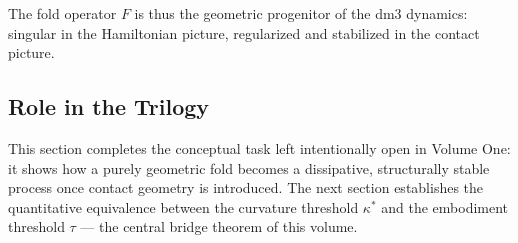 The fold operator $F$ is thus the geometric progenitor of the
dm3 dynamics: singular in the Hamiltonian picture, regularized
and stabilized in the contact picture.

\subsection{Role in the Trilogy}
\label{subsec:trilogy-role}

This section completes the conceptual task left intentionally
open in Volume One: it shows how a purely geometric fold becomes
a dissipative, structurally stable process once contact geometry
is introduced. The next section establishes the quantitative
equivalence between the curvature threshold $\kappa^*$ and the
embodiment threshold $\tau$ — the central bridge theorem of this
volume.
